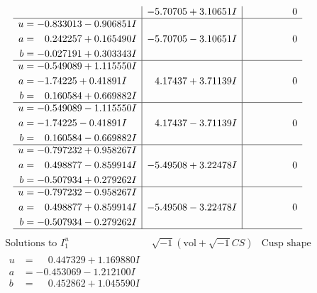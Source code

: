 \documentclass[1p]{elsarticle_modified}
\theoremstyle{definition}
\newcommand{\I}{\sqrt{-1}}
\begin{document}
$$\begin{array}{c|c|c}
 & -5.70705 + 3.10651 I & \phantom{-0.000000 } 0 \\ \hline\begin{aligned}
u &= -0.833013 - 0.906851 I \\
a &= \phantom{-}0.242257 + 0.165490 I \\
b &= -0.027191 + 0.303343 I\end{aligned}
 & -5.70705 - 3.10651 I & \phantom{-0.000000 } 0 \\ \hline\begin{aligned}
u &= -0.549089 + 1.115550 I \\
a &= -1.74225 + 0.41891 I \\
b &= \phantom{-}0.160584 + 0.669882 I\end{aligned}
 & \phantom{-}4.17437 + 3.71139 I & \phantom{-0.000000 } 0 \\ \hline\begin{aligned}
u &= -0.549089 - 1.115550 I \\
a &= -1.74225 - 0.41891 I \\
b &= \phantom{-}0.160584 - 0.669882 I\end{aligned}
 & \phantom{-}4.17437 - 3.71139 I & \phantom{-0.000000 } 0 \\ \hline\begin{aligned}
u &= -0.797232 + 0.958267 I \\
a &= \phantom{-}0.498877 - 0.859914 I \\
b &= -0.507934 + 0.279262 I\end{aligned}
 & -5.49508 + 3.22478 I & \phantom{-0.000000 } 0 \\ \hline\begin{aligned}
u &= -0.797232 - 0.958267 I \\
a &= \phantom{-}0.498877 + 0.859914 I \\
b &= -0.507934 - 0.279262 I\end{aligned}
 & -5.49508 - 3.22478 I & \phantom{-0.000000 } 0\\
 \hline 
 \end{array}$$\newpage$$\begin{array}{c|c|c}  
\text{Solutions to }I^u_{1}& \I (\text{vol} + \sqrt{-1}CS) & \text{Cusp shape}\\
 \hline 
\begin{aligned}
u &= \phantom{-}0.447329 + 1.169880 I \\
a &= -0.453069 - 1.212100 I \\
b &= \phantom{-}0.452862 + 1.045590 I\end{aligned}

\end{array}$$
\end{document}
